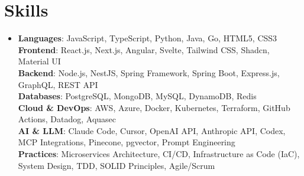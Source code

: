 \section{Skills}
  \begin{itemize}[leftmargin=0.15in, label={}]
    \item\small{
      \textbf{Languages}: JavaScript, TypeScript, Python, Java, Go, HTML5, CSS3 \\
      \textbf{Frontend}: React.js, Next.js, Angular, Svelte, Tailwind CSS, Shadcn, Material UI \\
      \textbf{Backend}: Node.js, NestJS, Spring Framework, Spring Boot, Express.js, GraphQL, REST API \\
      \textbf{Databases}: PostgreSQL, MongoDB, MySQL, DynamoDB, Redis \\
      \textbf{Cloud \& DevOps}: AWS, Azure, Docker, Kubernetes, Terraform, GitHub Actions, Datadog, Aquasec \\
      \textbf{AI \& LLM}: Claude Code, Cursor, OpenAI API, Anthropic API, Codex, MCP Integrations, Pinecone, pgvector, Prompt Engineering \\
      \textbf{Practices}: Microservices Architecture, CI/CD, Infrastructure as Code (IaC), System Design, TDD, SOLID Principles, Agile/Scrum
    }
  \end{itemize}